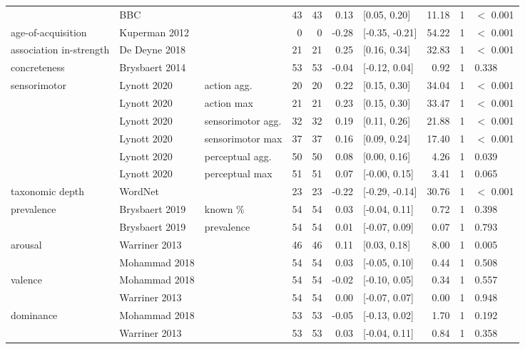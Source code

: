 \begin{table}[ht]
\begin{tabular}{lllrrrlrrl}
   & BBC &  & 43 & 43 & 0.13 & [0.05, 0.20] & 11.18 & 1 & $<$ 0.001 \\ 
  age-of-acquisition & Kuperman 2012 &  & 0 & 0 & -0.28 & [-0.35, -0.21] & 54.22 & 1 & $<$ 0.001 \\ 
  association in-strength & De Deyne 2018 &  & 21 & 21 & 0.25 & [0.16, 0.34] & 32.83 & 1 & $<$ 0.001 \\ 
  concreteness & Brysbaert 2014 &  & 53 & 53 & -0.04 & [-0.12, 0.04] & 0.92 & 1 & 0.338 \\ 
  sensorimotor & Lynott 2020 & action agg. & 20 & 20 & 0.22 & [0.15, 0.30] & 34.04 & 1 & $<$ 0.001 \\ 
   & Lynott 2020 & action max & 21 & 21 & 0.23 & [0.15, 0.30] & 33.47 & 1 & $<$ 0.001 \\ 
   & Lynott 2020 & sensorimotor agg. & 32 & 32 & 0.19 & [0.11, 0.26] & 21.88 & 1 & $<$ 0.001 \\ 
   & Lynott 2020 & sensorimotor max & 37 & 37 & 0.16 & [0.09, 0.24] & 17.40 & 1 & $<$ 0.001 \\ 
   & Lynott 2020 & perceptual agg. & 50 & 50 & 0.08 & [0.00, 0.16] & 4.26 & 1 & 0.039 \\ 
   & Lynott 2020 & perceptual max & 51 & 51 & 0.07 & [-0.00, 0.15] & 3.41 & 1 & 0.065 \\ 
  taxonomic depth & WordNet &  & 23 & 23 & -0.22 & [-0.29, -0.14] & 30.76 & 1 & $<$ 0.001 \\ 
  prevalence & Brysbaert 2019 & known \% & 54 & 54 & 0.03 & [-0.04, 0.11] & 0.72 & 1 & 0.398 \\ 
   & Brysbaert 2019 & prevalence & 54 & 54 & 0.01 & [-0.07, 0.09] & 0.07 & 1 & 0.793 \\ 
  arousal & Warriner 2013 &  & 46 & 46 & 0.11 & [0.03, 0.18] & 8.00 & 1 & 0.005 \\ 
   & Mohammad 2018 &  & 54 & 54 & 0.03 & [-0.05, 0.10] & 0.44 & 1 & 0.508 \\ 
  valence & Mohammad 2018 &  & 54 & 54 & -0.02 & [-0.10, 0.05] & 0.34 & 1 & 0.557 \\ 
   & Warriner 2013 &  & 54 & 54 & 0.00 & [-0.07, 0.07] & 0.00 & 1 & 0.948 \\ 
  dominance & Mohammad 2018 &  & 53 & 53 & -0.05 & [-0.13, 0.02] & 1.70 & 1 & 0.192 \\ 
   & Warriner 2013 &  & 53 & 53 & 0.03 & [-0.04, 0.11] & 0.84 & 1 & 0.358 \\ 
   \hline
\end{tabular}
\end{table}
